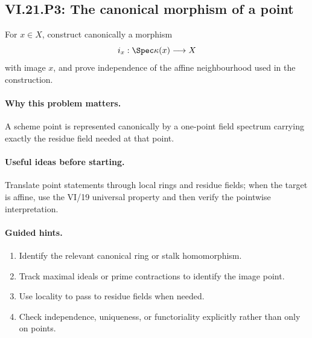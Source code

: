 \subsection*{VI.21.P3: The canonical morphism of a point}
\begin{problem}\label{prob:vi21-p03}
For $x\in X$, construct canonically a morphism
\[
i_x:\Spec\kappa(x)\longrightarrow X
\]
with image $x$, and prove independence of the affine neighbourhood used in the construction.
\end{problem}

\ifdefined\FullProblemDossiers
\paragraph{Why this problem matters.}
A scheme point is represented canonically by a one-point field spectrum carrying exactly the residue field needed at that point.

\paragraph{Useful ideas before starting.}
Translate point statements through local rings and residue fields; when the target is affine, use the VI/19 universal property and then verify the pointwise interpretation.

\paragraph{Guided hints.}
\begin{enumerate}
\item Identify the relevant canonical ring or stalk homomorphism.
\item Track maximal ideals or prime contractions to identify the image point.
\item Use locality to pass to residue fields when needed.
\item Check independence, uniqueness, or functoriality explicitly rather than only on points.
\end{enumerate}

